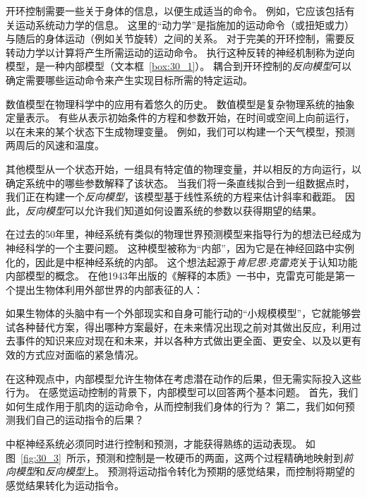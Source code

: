 开环控制需要一些关于身体的信息，以便生成适当的命令。
例如，它应该包括有关运动系统动力学的信息。
这里的“动力学”是指施加的运动命令（或扭矩或力）与随后的身体运动（例如关节旋转）之间的关系。
对于完美的开环控制，需要反转动力学以计算将产生所需运动的运动命令。
执行这种反转的神经机制称为逆向模型，是一种内部模型（文本框~\ref{box:30_1}）。
耦合到开环控制的\textit{反向模型}可以确定需要哪些运动命令来产生实现目标所需的特定运动。


\begin{proposition}[内部模型] \label{box:30_1}
	
	\quad \quad 数值模型在物理科学中的应用有着悠久的历史。
	数值模型是复杂物理系统的抽象定量表示。
	有些从表示初始条件的方程和参数开始，在时间或空间上向前运行，以在未来的某个状态下生成物理变量。
	例如，我们可以构建一个天气模型，预测两周后的风速和温度。
	
	\quad \quad 其他模型从一个状态开始，一组具有特定值的物理变量，并以相反的方向运行，以确定系统中的哪些参数解释了该状态。
	当我们将一条直线拟合到一组数据点时，我们正在构建一个\textit{反向模型}，该模型基于线性系统的方程来估计斜率和截距。
	因此，\textit{反向模型}可以允许我们知道如何设置系统的参数以获得期望的结果。
	
	\quad \quad 在过去的50年里，神经系统有类似的物理世界预测模型来指导行为的想法已经成为神经科学的一个主要问题。
	这种模型被称为“内部”，因为它是在神经回路中实例化的，因此是中枢神经系统的内部。
	这个想法起源于\textit{肯尼思$\cdot$克雷克}关于认知功能内部模型的概念。
	在他1943年出版的《解释的本质》一书中，克雷克可能是第一个提出生物体利用外部世界的内部表征的人：
	
	\quad \quad 如果生物体的头脑中有一个外部现实和自身可能行动的“小规模模型”，它就能够尝试各种替代方案，得出哪种方案最好，在未来情况出现之前对其做出反应，利用过去事件的知识来应对现在和未来，并以各种方式做出更全面、更安全、以及以更有效的方式应对面临的紧急情况。
	
	\quad \quad 在这种观点中，内部模型允许生物体在考虑潜在动作的后果，但无需实际投入这些行为。
	在感觉运动控制的背景下，内部模型可以回答两个基本问题。
	首先，我们如何生成作用于肌肉的运动命令，从而控制我们身体的行为？
	第二，我们如何预测我们自己的运动指令的后果？
	
	\quad \quad 中枢神经系统必须同时进行控制和预测，才能获得熟练的运动表现。
	如图~\ref{fig:30_3}~所示，预测和控制是一枚硬币的两面，这两个过程精确地映射到\textit{前向模型}和\textit{反向模型}上。
	预测将运动指令转化为预期的感觉结果，而控制将期望的感觉结果转化为运动指令。
	
\end{proposition}


